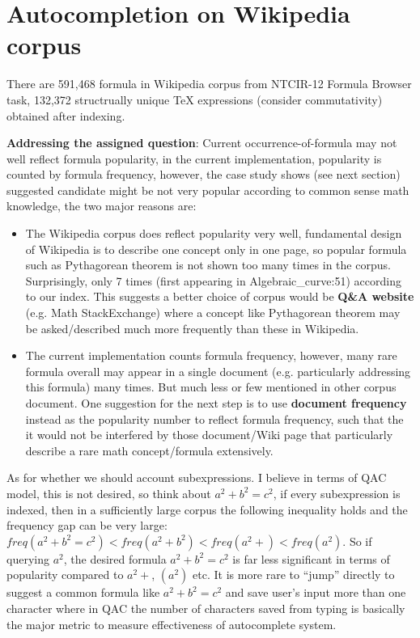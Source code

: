 \documentclass[12pt]{article} %
\begin{document}
\section*{Autocompletion on Wikipedia corpus}
There are 591,468 formula in Wikipedia corpus from NTCIR-12 Formula Browser task,
132,372 structrually unique TeX expressions (consider commutativity) obtained after indexing.

\textbf{Addressing the assigned question}:
Current occurrence-of-formula may not well reflect formula popularity, in the current implementation, popularity is counted by formula frequency, however, the case study shows (see next section) suggested candidate might be not very popular according to common sense math knowledge, the two major reasons are:
\begin{itemize}
\item The Wikipedia corpus does reflect popularity very well,
fundamental design of Wikipedia is to describe one concept only in one page, so popular formula such as Pythagorean theorem is not shown too many times in the corpus. Surprisingly, only 7 times (first appearing in Algebraic\_curve:51) according to our index. This suggests a better choice of corpus would be \textbf{Q\&A website} (e.g. Math StackExchange) where a concept like Pythagorean theorem may be asked/described much more frequently than these in Wikipedia.
\item The current implementation counts formula frequency, however, many rare formula overall may appear in a single document (e.g. particularly addressing this formula) many times. But much less or few mentioned in other corpus document. One suggestion for the next step is to use \textbf{document frequency} instead as the popularity number to reflect formula frequency, such that the it would not be interfered by those document/Wiki page that particularly describe a rare math concept/formula extensively.
\end{itemize}

As for whether we should account subexpressions.
I believe in terms of QAC model, this is not desired, so think about $a^2+b^2=c^2$, if every subexpression is indexed, then in a sufficiently large corpus the following inequality holds and the frequency gap can be very large: $freq(a^2+b^2=c^2) < freq(a^2+b^2) < freq(a^2+) < freq(a^2)$. So if querying $a^2$, the desired formula $a^2+b^2=c^2$ is far less significant in terms of popularity compared to $a^2 + $, $(a^2)$ etc. It is more rare to ``jump'' directly to suggest a common formula like  $a^2+b^2=c^2$ and save user's input more than one character where in QAC the number of characters saved from typing is basically the major metric to measure effectiveness of autocomplete system. 
\end{document}
